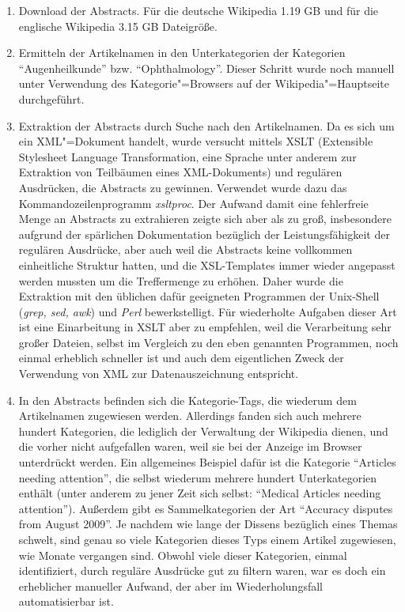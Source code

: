 \documentclass[pagesize,paper=A4,DIV=calc,fontsize=12pt,draft=false]{scrreprt}
\begin{document}
\begin{enumerate}
\item Download der Abstracts. Für die deutsche Wikipedia 1.19 GB und für die englische Wikipedia 3.15 GB Dateigröße.
\item Ermitteln der Artikelnamen in den Unterkategorien der Kategorien \enquote{Augenheilkunde} bzw. \enquote{Ophthalmology}. 
Dieser Schritt wurde noch manuell unter Verwendung des Kategorie"=Browsers auf der Wikipedia"=Hauptseite durchgeführt. 
\item Extraktion der Abstracts durch Suche nach den Artikelnamen. 
Da es sich um ein XML"=Dokument handelt, wurde versucht mittels XSLT (Extensible Stylesheet Language Transformation, eine Sprache unter anderem zur Extraktion von Teilbäumen eines XML-Dokuments) und regulären Ausdrücken, die Abstracts zu gewinnen. 
Verwendet wurde dazu das Kommandozeilenprogramm \emph{xsltproc}. 
Der Aufwand damit eine fehlerfreie Menge an Abstracts zu extrahieren zeigte sich aber als zu groß, insbesondere aufgrund der spärlichen Dokumentation bezüglich der Leistungsfähigkeit der regulären Ausdrücke, aber auch weil die Abstracts keine vollkommen einheitliche Struktur hatten, und die XSL-Templates immer wieder angepasst werden mussten um die Treffermenge zu erhöhen.
Daher wurde die Extraktion mit den üblichen dafür geeigneten Programmen der Unix-Shell (\emph{grep, sed, awk}) und \emph{Perl} bewerkstelligt. 
Für wiederholte Aufgaben dieser Art ist eine Einarbeitung in XSLT aber zu empfehlen, weil die Verarbeitung sehr großer Dateien, selbst im Vergleich zu den eben genannten Programmen, noch einmal erheblich schneller ist und auch dem eigentlichen Zweck der Verwendung von XML zur Datenauszeichnung entspricht. 
\item In den Abstracts befinden sich die Kategorie-Tags, die wiederum dem Artikelnamen zugewiesen werden. 
Allerdings fanden sich auch mehrere hundert Kategorien, die lediglich der Verwaltung der Wikipedia dienen, und die vorher nicht aufgefallen waren, weil sie bei der Anzeige im Browser unterdrückt werden. 
Ein allgemeines Beispiel dafür ist die Kategorie \enquote{Articles needing attention}, die selbst wiederum mehrere hundert Unterkategorien enthält (unter anderem zu jener Zeit sich selbst: \enquote{Medical Articles needing attention}). 
Außerdem gibt es Sammelkategorien der Art \enquote{Accuracy disputes from August 2009}. 
Je nachdem wie lange der Dissens bezüglich eines Themas schwelt, sind genau so viele Kategorien dieses Typs einem Artikel zugewiesen, wie Monate vergangen sind. 
Obwohl viele dieser Kategorien, einmal identifiziert, durch reguläre Ausdrücke gut zu filtern waren, war es doch ein erheblicher manueller Aufwand, der aber im Wiederholungsfall automatisierbar ist.
\end{enumerate}
\end{document}
